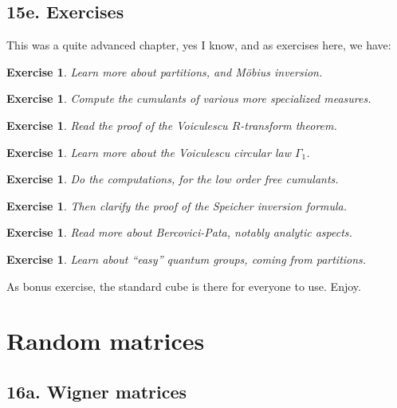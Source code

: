 \documentclass[12pt]{amsbook}
\newtheorem{exercise}[theorem]{Exercise}
\begin{document}
\section*{15e. Exercises}

This was a quite advanced chapter, yes I know, and as exercises here, we have:

\begin{exercise}
Learn more about partitions, and M\"obius inversion.
\end{exercise}

\begin{exercise}
Compute the cumulants of various more specialized measures.
\end{exercise}

\begin{exercise}
Read the proof of the Voiculescu $R$-transform theorem. 
\end{exercise}

\begin{exercise}
Learn more about the Voiculescu circular law $\Gamma_1$.
\end{exercise}

\begin{exercise}
Do the computations, for the low order free cumulants.
\end{exercise}

\begin{exercise}
Then clarify the proof of the Speicher inversion formula.
\end{exercise}

\begin{exercise}
Read more about Bercovici-Pata, notably analytic aspects.
\end{exercise}

\begin{exercise}
Learn about ``easy'' quantum groups, coming from partitions.
\end{exercise}

As bonus exercise, the standard cube is there for everyone to use. Enjoy.

\chapter{Random matrices}

\section*{16a. Wigner matrices}
\end{document}
